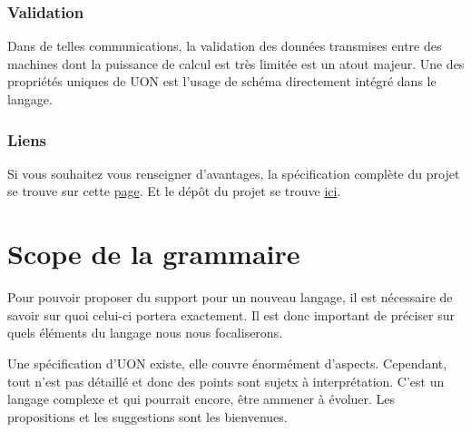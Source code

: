 \documentclass[
    iict, %
    il, %
]{heig-tb}
\begin{document}
\subsection{Validation}
Dans de telles communications, la validation des données transmises entre des machines dont la puissance de calcul est très limitée est un atout majeur.
Une des propriétés uniques de UON est l'usage de schéma directement intégré dans le langage.


\subsection{Liens}
Si vous souhaitez vous renseigner d'avantages, la spécification complète du projet se trouve sur cette \href{https://github.com/uon-language/specification/}{page}.
Et le dépôt du projet se trouve \href{https://github.com/uon-language/specification}{ici}.






\chapter{Scope de la grammaire}\label{grammar scope}
Pour pouvoir proposer du support pour un nouveau langage, il est nécessaire de savoir sur quoi celui-ci portera exactement.
Il est donc important de préciser sur quels éléments du langage nous nous focaliserons.

Une spécification d'UON existe, elle couvre énormément d'aspects. Cependant, tout n'est pas détaillé et donc des points sont sujetx à interprétation.
C'est un langage complexe et qui pourrait encore, être ammener à évoluer. Les propositions et les suggestions sont les bienvenues.
\end{document}
